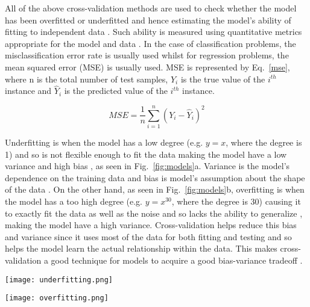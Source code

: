 All of the above cross-validation methods are used to check whether the model has been overfitted or underfitted and hence estimating the model's ability of fitting to independent data . Such ability is measured using quantitative metrics appropriate for the model and data \cite[-3\baselineskip]{kohavi1995study, arlot2010survey}. In the case of classification problems, the misclassification error rate is usually used whilst for regression problems, the mean squared error (MSE) is usually used. MSE is represented by Eq.~\ref{mse}, where n is the total number of test samples, $Y_i$ is the true value of the $i^{th}$ instance and $\hat{Y}_i$ is the predicted value of the $i^{th}$ instance.

\begin{equation}\label{mse}
MSE = \frac{1}{n}\sum^{n}_{i=1}(Y_i - \hat{Y}_i)^2
\end{equation}

Underfitting  is when the model has a low degree (e.g. $y = x$, where the degree is 1) and so is not flexible enough to fit the data making the model have a low variance and high bias \cite{baumann2003cross}, as seen in Fig.~\ref{fig:models}a. Variance is the model's dependence on the training data and bias is model's assumption about the shape of the data \cite{arlot2010survey}. On the other hand, as seen in Fig.~\ref{fig:models}b, overfitting  is when the model has a too high degree (e.g. $y = x^{30}$, where the degree is 30) causing it to exactly fit the data as well as the noise and so lacks the ability to generalize \cite{baumann2003cross}, making the model have a high variance. Cross-validation helps reduce this bias and variance since it uses most of the data for both fitting and testing and so helps the model learn the actual relationship within the data. This makes cross-validation a good technique for models to acquire a good bias-variance tradeoff \cite{arlot2010survey}.

\begin{figure*}
\centering
\begin{subfloat}
  \centering
  \texttt{[image: underfitting.png]}
  \caption{Underfitting}
  \label{fig:underfitting}
\end{subfloat}
\begin{subfloat}
  \centering
  \texttt{[image: overfitting.png]}
  \caption{Overfitting}
  \label{fig:overfitting}
\end{subfloat}
\caption{Underfitting (left) \& Overfitting (right)}
\label{fig:models}
\end{figure*}

